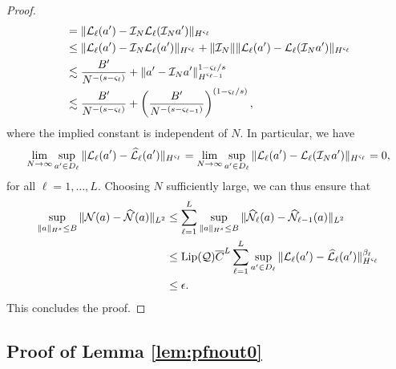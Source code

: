 \documentclass[reqno,a4paper]{amsart}
\begin{document}
\begin{proof}
\begin{align*}
&=
\Vert \mathcal{L}_{\ell}(a') - \mathcal{I}_N \mathcal{L}_{\ell}(\mathcal{I}_N a') \Vert_{H^{\varsigma_{\ell}}}
\\
&\le
\Vert \mathcal{L}_{\ell}(a') - \mathcal{I}_N \mathcal{L}_{\ell}(a') \Vert_{H^{\varsigma_{\ell}}}
+
\Vert \mathcal{I}_N \Vert \Vert \mathcal{L}_{\ell}(a') - \mathcal{L}_{\ell}(\mathcal{I}_N a') \Vert_{H^{\varsigma_{\ell}}}
\\
&\lesssim
\frac{B'}{N^{-(s-\varsigma_\ell)}}
+
\Vert a' - \mathcal{I}_N a' \Vert_{H^{\varsigma_{\ell-1}}}^{1-\varsigma_{\ell}/s}
\\
&\lesssim
\frac{B'}{N^{-(s-\varsigma_\ell)}}
+
\left(
\frac{
B'
}{
N^{-(s-\varsigma_{\ell-1})}
}
\right)^{(1-\varsigma_\ell/s)}
,
\end{align*}
where the implied constant is independent of $N$. In particular, we have 
\[
\lim_{N\to \infty} \sup_{a'\in D_\ell} \Vert \mathcal{L}_{\ell}(a') - \widehat{\mathcal{L}}_{\ell}(a') \Vert_{H^{\varsigma_{\ell}}} 
=
\lim_{N\to \infty} \sup_{a'\in D_\ell} \Vert \mathcal{L}_{\ell}(a') - \mathcal{L}_{\ell}(\mathcal{I}_N a') \Vert_{H^{\varsigma_{\ell}}} 
= 0,
\]
for all $\ell=1,\dots, L$.  Choosing $N$ sufficiently large, we can thus ensure that 
\begin{align*}
\sup_{\Vert a \Vert_{H^s}\le B}
\Vert \mathcal{N}(a) - \widehat{\mathcal{N}}(a) \Vert_{L^2}
&\le
\sum_{\ell=1}^L 
\sup_{\Vert a \Vert_{H^s}\le B}
\Vert \widehat{\mathcal{N}}_\ell(a) - \widehat{\mathcal{N}}_{\ell-1}(a) \Vert_{L^2}
\\
&\le
\mathrm{Lip}(\mathcal{Q}) \overline{C}^L
\sum_{\ell=1}^L \sup_{a'\in D_\ell} \Vert \mathcal{L}_\ell(a') - \widehat{\mathcal{L}}_{\ell}(a') \Vert_{H^{\varsigma_{\ell}}}^{\beta_\ell}
\\
&\le
\epsilon.
\end{align*}
This concludes the proof.
\end{proof}

\subsection{
Proof of Lemma \ref{lem:pfnout0}
}
\label{app:pfnout0}
\end{document}
